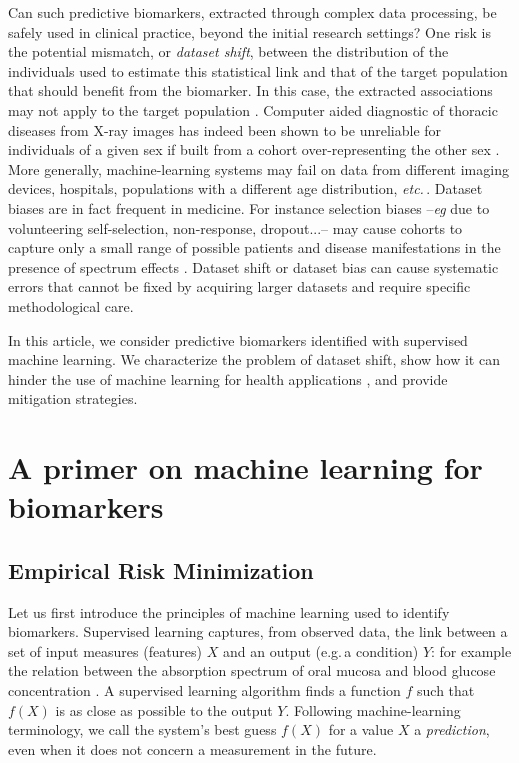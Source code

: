\documentclass[twocolumn]{article}
\newcommand{\eg}{e.g.\,}
\newcommand{\etc}{\emph{etc.}\,}
\begin{document}
Can such predictive biomarkers, extracted through complex data processing, be safely
used in clinical practice, beyond the initial research settings? One risk
is the potential mismatch, or \emph{dataset shift}, between the distribution
of the individuals used to estimate this statistical link and that of the target
population that should benefit from the biomarker. In this case,
the extracted associations may not apply to the target
population \citep{kakarmath2020best}.
%
Computer aided diagnostic of thoracic diseases
from X-ray images has indeed been shown to be unreliable for individuals of a 
given sex if built from a cohort over-representing the other sex
\citep{larrazabal2020gender}.
%
More generally, machine-learning systems may fail on data from different
imaging devices, hospitals, populations with a different age distribution, \etc.
%
Dataset biases are in fact frequent in medicine. For instance selection
biases --\emph{eg} due to volunteering self-selection, non-response,
dropout...-- \citep{rothman2012epidemiology,tripepi2010selection}
may cause cohorts to capture only a small range of possible patients and
disease manifestations in the presence of 
spectrum effects \citep{ransohoff1978problems,mulherin2002spectrum}.
%
Dataset shift or dataset bias can
cause systematic errors that cannot be fixed by
acquiring larger datasets and require specific methodological care.


In this article, we consider predictive biomarkers identified with supervised machine learning.
We characterize the problem of dataset shift, show how it can hinder the use
of machine learning for health applications
\citep{woo2017building,wynants2020prediction}, and provide mitigation
strategies.
%

\section{A primer on machine learning for biomarkers}

\subsection{Empirical Risk Minimization}

Let us first introduce the principles of machine learning used to identify biomarkers.
%
Supervised learning captures, from observed data,
the link between a set of input
measures (features) $X$ and an output (\eg a condition) $Y$: for example the relation between the absorption spectrum of
oral mucosa and blood glucose concentration \citep{kasahara2018noninvasive}. A
supervised learning algorithm finds a function $f$ such that $f(X)$ is as close as possible to
the output $Y$.
%
Following machine-learning terminology, we call the system's best guess $f(X)$
for a value $X$ a \emph{prediction}, even when it does not concern a measurement
in the future.
\end{document}
